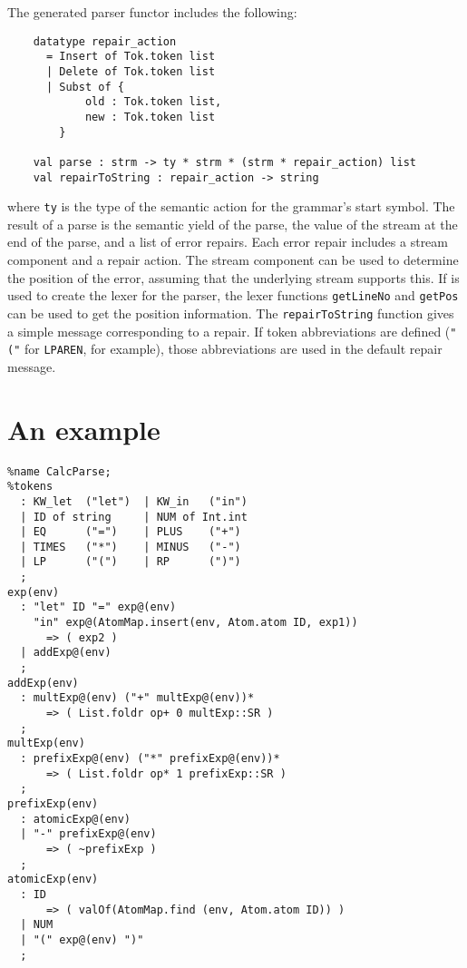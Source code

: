 The generated parser functor includes the following:
\begin{verbatim}
    datatype repair_action
      = Insert of Tok.token list
      | Delete of Tok.token list
      | Subst of {
            old : Tok.token list,
            new : Tok.token list
        }

    val parse : strm -> ty * strm * (strm * repair_action) list
    val repairToString : repair_action -> string
\end{verbatim}
where {\tt ty} is the type of the semantic action for the grammar's start symbol.  The result of a parse is the semantic yield of the parse, the value of the stream at the end of the parse, and a list of error repairs.  Each error repair includes a stream component and a repair action.  The stream component can be used to determine the position of the error, assuming that the underlying stream supports this.  If \ulex{} is used to create the lexer for the parser, the lexer functions {\tt getLineNo} and {\tt getPos} can be used to get the position information.  The {\tt repairToString} function gives a simple message corresponding to a repair.  If token abbreviations are defined ({\tt "("} for {\tt LPAREN}, for example), those abbreviations are used in the default repair message.

\section{An example}

\begin{verbatim}
%name CalcParse;
%tokens
  : KW_let  ("let")  | KW_in   ("in")
  | ID of string     | NUM of Int.int
  | EQ      ("=")    | PLUS    ("+")
  | TIMES   ("*")    | MINUS   ("-")
  | LP      ("(")    | RP      (")")
  ;
exp(env)
  : "let" ID "=" exp@(env) 
    "in" exp@(AtomMap.insert(env, Atom.atom ID, exp1))
      => ( exp2 )
  | addExp@(env)
  ;
addExp(env)
  : multExp@(env) ("+" multExp@(env))*
      => ( List.foldr op+ 0 multExp::SR )
  ;
multExp(env)
  : prefixExp@(env) ("*" prefixExp@(env))*
      => ( List.foldr op* 1 prefixExp::SR )
  ;
prefixExp(env)
  : atomicExp@(env)
  | "-" prefixExp@(env)
      => ( ~prefixExp )
  ;
atomicExp(env)
  : ID  
      => ( valOf(AtomMap.find (env, Atom.atom ID)) )
  | NUM
  | "(" exp@(env) ")"
  ;
\end{verbatim}
